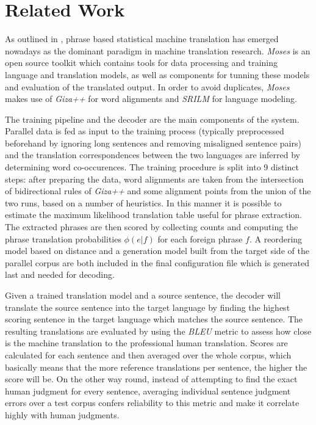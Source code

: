 \documentclass[11pt]{article}
\begin{document}
\section{Related Work}
\label{existing}
As outlined in \cite{moses}, phrase based statistical machine translation has emerged nowadays as the dominant paradigm in machine translation research. \textit{Moses} \cite{mosesurl} is an open source toolkit which contains tools for data processing and training language and translation models, as well as components for tunning these models and evaluation of the translated output. In order to avoid duplicates, \textit{Moses} makes use of \textit{Giza++} \cite{giza++} for word alignments and \textit{SRILM} \cite{srilm} for language modeling. 

The training pipeline and the decoder are the main components of the system. Parallel data is fed as input to the training process (typically preprocessed beforehand by ignoring long sentences and removing misaligned sentence pairs) and the translation correspondences between the two languages are inferred by determining word co-occurences. The training procedure is split into 9 distinct steps: after preparing the data, word alignments are taken from the intersection of bidirectional rules of \textit{Giza++} and some alignment points from the union of the two runs, based on a number of heuristics. In this manner it is possible to estimate the maximum likelihood translation table useful for phrase extraction. The extracted phrases are then scored by collecting counts and computing the phrase translation probabilities $\phi(e|f)$ for each foreign phrase $f$. A reordering model based on distance and a generation model built from the target side of the parallel corpus are both included in the final configuration file which is generated last and needed for decoding.

Given a trained translation model and a source sentence, the decoder will translate the source sentence into the target language by finding the highest scoring sentence in the target language which matches the source sentence. The resulting translations are evaluated by using the \textit{BLEU} metric to assess how close is the machine translation to the professional human translation. Scores are calculated for each sentence and then averaged over the whole corpus, which basically means that the more reference translations per sentence, the higher the score will be. On the other way round, instead of attempting to find the exact human judgment for every sentence, averaging individual sentence judgment errors over a test corpus confers reliability to this metric and make it correlate highly with human judgments.
\end{document}
